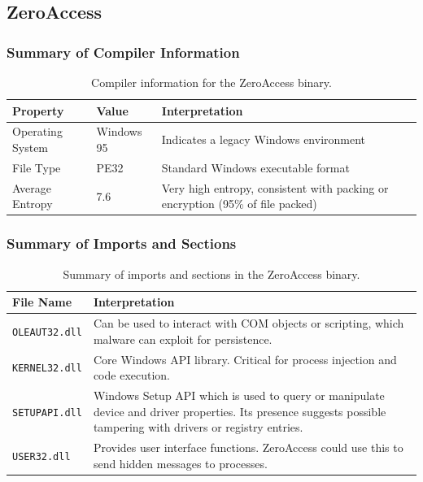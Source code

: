 \documentclass{article}
\begin{document}
\subsection{ZeroAccess}
\subsubsection{Summary of Compiler Information}
\begin{table}[H]
  \centering
  \begin{tabular}{|p{4cm}|p{2cm}|p{6cm}|}
    \hline
    \textbf{Property} & \textbf{Value} & \textbf{Interpretation} \\
    \hline
    Operating System & Windows 95 & Indicates a legacy Windows environment \\
    \hline
    File Type & PE32 & Standard Windows executable format \\
    \hline
    Average Entropy & 7.6 & Very high entropy, consistent with packing or encryption (95\% of file packed) \\
    \hline
  \end{tabular}
  \caption{Compiler information for the ZeroAccess binary.}
  \label{tab:zeroaccess-compiler}
\end{table}

\subsubsection{Summary of Imports and Sections}
\begin{table}[H]
  \centering
  \begin{tabular}{|p{4cm}|p{8cm}|}
    \hline
    \textbf{File Name} & \textbf{Interpretation} \\
    \hline
    \texttt{OLEAUT32.dll} & Can be used to interact with COM objects or scripting, which malware can exploit for persistence. \\
    \hline
    \texttt{KERNEL32.dll} & Core Windows API library. Critical for process injection and code execution. \\
    \hline
    \texttt{SETUPAPI.dll} & Windows Setup API which is used to query or manipulate device and driver properties. Its presence suggests possible tampering with drivers or registry entries. \\
    \hline
    \texttt{USER32.dll} & Provides user interface functions. ZeroAccess could use this to send hidden messages to processes. \\
    \hline
  \end{tabular}
  \caption{Summary of imports and sections in the ZeroAccess binary.}
  \label{tab:zeroaccess-imports}
\end{table}
\end{document}
